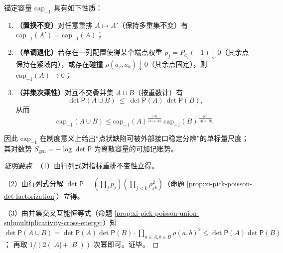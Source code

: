 \begin{proposition}\label{prop:xi-anchored-capacity-three-properties}
锚定容量 \(\mathrm{cap}_{-1}\) 具有如下性质：
\begin{enumerate}
  \item \textbf{（置换不变）}对任意重排 \(A\mapsto A'\)（保持多重集不变）有 \(\mathrm{cap}_{-1}(A')=\mathrm{cap}_{-1}(A)\)；
  \item \textbf{（单调退化）}若存在一列配置使得某个端点权重 \(p_j=P_{a_j}(-1)\downarrow 0\)（其余点保持在紧域内），或存在碰撞 \(\rho(a_j,a_k)\downarrow 0\)（其余点固定），则 \(\mathrm{cap}_{-1}(A)\to 0\)；
  \item \textbf{（并集次乘性）}对互不交叠并集 \(A\sqcup B\)（按重数计）有
  \[
  \det\mathsf P(A\cup B)\ \le\ \det\mathsf P(A)\,\det\mathsf P(B),
  \]
  从而
  \[
  \boxed{\;
  \mathrm{cap}_{-1}(A\cup B)
  \le
  \mathrm{cap}_{-1}(A)^{\frac{|A|}{|A|+|B|}}\,
  \mathrm{cap}_{-1}(B)^{\frac{|B|}{|A|+|B|}}.\;}
  \]
\end{enumerate}
因此 \(\mathrm{cap}_{-1}\) 在制度意义上给出“点状缺陷可被外部接口稳定分辨”的单标量尺度；其对数势 \(S_{\mathrm{gen}}=-\log\det\mathsf P\) 为离散容量的可加记账势。
\end{proposition}
\begin{proof}[证明要点]
（1）由行列式对指标重排不变性立得。
\par
（2）由行列式分解 \(\det\mathsf P=(\prod_j p_j)(\prod_{j<k}\rho_{jk}^2)\)（命题 \ref{prop:xi-pick-poisson-det-factorization}）立得。
\par
（3）由并集交叉互能恒等式（命题 \ref{prop:xi-pick-poisson-union-submultiplicativity-cross-energy}）知
\(
\det\mathsf P(A\cup B)=\det\mathsf P(A)\det\mathsf P(B)\cdot \prod_{a\in A,b\in B}\rho(a,b)^2
\le \det\mathsf P(A)\det\mathsf P(B)
\)；
再取 \(1/(2(|A|+|B|))\) 次幂即可。证毕。
\end{proof}

